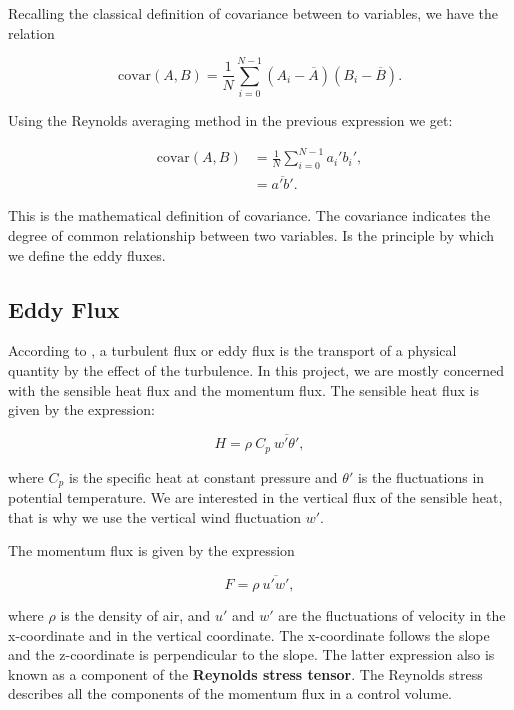 Recalling the classical definition of covariance between to variables, we have the relation 

\begin{equation}
    \text{covar}(A,B) = \frac{1}{N}\sum_{i=0}^{N-1} (A_i - \overline{A})(B_i - \overline{B}).
\end{equation}

\noindent Using the Reynolds averaging method in the previous expression we get:

\begin{subequations}
\begin{align}
    \text{covar}(A,B) &= \frac{1}{N}\sum_{i=0}^{N-1} a_i' b_i', \\
    &= \overline{a'b'}.
\end{align}
\end{subequations}

\noindent This is the mathematical definition of covariance. The covariance indicates the degree of common relationship between two variables. Is the principle by which we define the eddy fluxes.

\subsection{Eddy Flux}
According to \cite{stull2012introduction}, a turbulent flux or eddy flux is the transport of a physical quantity by the effect of the turbulence. In this project, we are mostly concerned with the sensible heat flux and the momentum flux. The sensible heat flux is given by the expression:

\begin{equation}
    H = \rho \ C_p \ \overline{w'\theta'},
\end{equation}

\noindent where $C_p$ is the specific heat at constant pressure and $\theta '$ is the fluctuations in potential temperature. We are interested in the vertical flux of the sensible heat, that is why we use the vertical wind fluctuation $w'$.

The momentum flux is given by the expression

\begin{equation}
    F = \rho \ \overline{u'w'}, 
\end{equation}

\noindent where $\rho$ is the density of air, and $u'$ and $w'$ are the fluctuations of velocity in the x-coordinate and in the vertical coordinate. The x-coordinate follows the slope and the z-coordinate is perpendicular to the slope. The latter expression also is known as a component of the \textbf{Reynolds stress tensor}. The Reynolds stress describes all the components of the momentum flux in a control volume.

